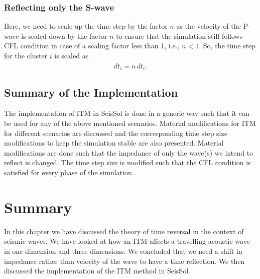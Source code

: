 \subsubsection{Reflecting only the S-wave}
Here, we need to scale up the time step by the factor $n$ as the velocity of the P-wave is scaled down by the factor $n$ to ensure that the simulation still follows
\ac{CFL} condition in case of a scaling factor less than 1, i.e., $n < 1$. So, the time step for the cluster $i$ is scaled as
\begin{equation}
    \hat{dt}_i = n \, dt_i .
\end{equation}
\subsection{Summary of the Implementation}
The implementation of \ac{ITM} in SeisSol is done in a generic way such that it can be used for any of the above mentioned scenarios. 
Material modifications for \ac{ITM} for different scenarios are discussed and the corresponding time step size modifications to keep the simulation
stable are also presented. Material modifications are done such that the impedance of only the wave(s) we intend to reflect is changed. 
The time step size is modified such that the \ac{CFL} condition is satisfied for every phase of the simulation. 

\section{Summary}
In this chapter we have discussed the theory of time reversal in the context of seismic waves. We have looked at how an \ac{ITM} affects a travelling acoustic
wave in one dimension and three dimensions. We concluded that we need a shift in impedance rather than velocity of the wave to have a time reflection. We then discussed
the implementation of the \ac{ITM} method in SeisSol.
